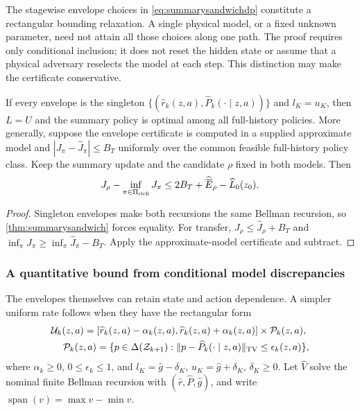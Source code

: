The stagewise envelope choices in \eqref{eq:summarysandwichdp} constitute
a rectangular bounding relaxation. A single physical model, or a fixed
unknown parameter, need not attain all those choices along one path.
The proof requires only conditional inclusion; it does not reset the hidden
state or assume that a physical adversary reselects the model at each step.
This distinction may make the certificate conservative.

\begin{corollary}
\label{cor:summarysufficiency}
If every envelope is the singleton
$\{(\widehat r_k(z,a),\widehat P_k(\cdot\mid z,a))\}$ and $l_K=u_K$,
then $L=U$ and the summary policy is optimal among all full-history policies.
More generally, suppose the envelope certificate is computed in a supplied
approximate model and
$|J_\pi-\widehat J_\pi|\le B_T$ uniformly over the common feasible
full-history policy class. Keep the summary update and the candidate $\rho$
fixed in both models. Then
\begin{equation}\label{eq:summarytransfer}
 J_\rho-\inf_{\pi\in\Pi_{\rm rich}}J_\pi
 \le 2B_T+\widehat{\overline E}_\rho-\widehat L_0(z_0).
\end{equation}
\end{corollary}
\begin{proof}
Singleton envelopes make both recursions the same Bellman recursion, so
\cref{thm:summarysandwich} forces equality. For transfer,
$J_\rho\le\widehat J_\rho+B_T$ and
$\inf_\pi J_\pi\ge\inf_\pi\widehat J_\pi-B_T$.
Apply the approximate-model certificate and subtract.
\end{proof}

\subsubsection*{A quantitative bound from conditional model discrepancies}

The envelopes themselves can retain state and action dependence. A simpler
uniform rate follows when they have the rectangular form
\begin{equation}\label{eq:summarytvenvelope}
 \begin{aligned}
 \mathcal U_k(z,a)=
 [\widehat r_k(z,a)-\alpha_k(z,a),\widehat r_k(z,a)+\alpha_k(z,a)]
 &\times\mathcal P_k(z,a),\\
 \mathcal P_k(z,a)=\{p\in\Delta(\mathcal Z_{k+1}):
              \|p-\widehat P_k(\cdot\mid z,a)\|_{\operatorname{TV}}
 &\le\epsilon_k(z,a)\},
 \end{aligned}
\end{equation}
where $\alpha_k\ge0$, $0\le\epsilon_k\le1$, and
$l_K=\widehat g-\delta_K$, $u_K=\widehat g+\delta_K$, $\delta_K\ge0$.
Let $\widehat V$ solve the nominal finite Bellman recursion with
$(\widehat r,\widehat P,\widehat g)$, and write
$\operatorname{span}(v)=\max v-\min v$.

